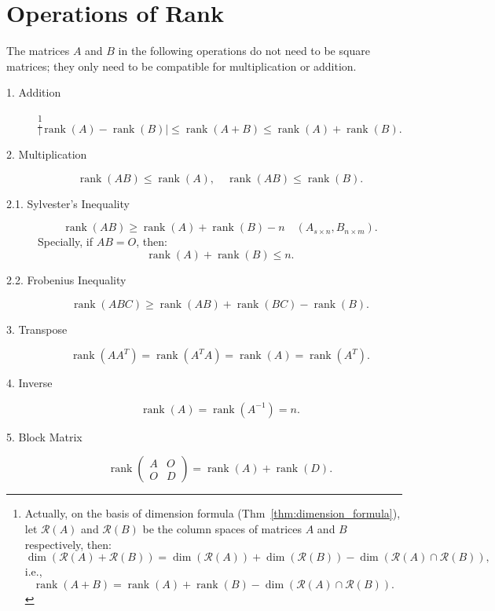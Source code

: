 \documentclass[11pt]{../../TexTemplate/elegantbook} %
\begin{document}
\section{Operations of Rank}
\begin{proposition}
    The matrices \( A \) and \( B \) in the following operations do not need to be square matrices; 
    they only need to be compatible for multiplication or addition.
    \begin{description}
        \item [1. Addition]\footnote{
            Actually, on the basis of dimension formula (Thm~\ref{thm:dimension_formula}),
            let \( \mathcal{R}(A) \) and \( \mathcal{R}(B) \) be the column spaces of matrices \( A \) and \( B \) respectively,
            then:
            \[
            \operatorname{dim}(\mathcal{R}(A) + \mathcal{R}(B)) = 
            \operatorname{dim}(\mathcal{R}(A)) + \operatorname{dim}(\mathcal{R}(B)) - 
            \operatorname{dim}(\mathcal{R}(A) \cap \mathcal{R}(B)),
            \]
            i.e.,
            \[
            \operatorname{rank}(A + B) = \operatorname{rank}(A) + \operatorname{rank}(B) - 
            \operatorname{dim}(\mathcal{R}(A) \cap \mathcal{R}(B)).
            \]
        }
        \[
        \left| \operatorname{rank}(A) - \operatorname{rank}(B) \right| \leqslant 
        \operatorname{rank}(A + B) \leqslant \operatorname{rank}(A) + \operatorname{rank}(B).
        \]
        \item [2. Multiplication]
        \[
        \operatorname{rank}(AB) \leqslant \operatorname{rank}(A), \quad \operatorname{rank}(AB) \leqslant \operatorname{rank}(B).
        \]
        \item[2.1. Sylvester's Inequality]
        \[
        \operatorname{rank}(AB) \geqslant \operatorname{rank}(A) + \operatorname{rank}(B) - n \quad (A_{s \times n}, B_{n \times m}).
        \]
        Specially, if \( AB = O \), then:
        \[
        \operatorname{rank}(A) + \operatorname{rank}(B) \leqslant n.
        \]

        \item[2.2. Frobenius Inequality]
        \[
        \operatorname{rank}(ABC) \geqslant \operatorname{rank}(AB) + \operatorname{rank}(BC) - \operatorname{rank}(B).
        \]

        \item [3. Transpose]
        \[
        \operatorname{rank}(AA^T) = \operatorname{rank}(A^TA) = \operatorname{rank}(A) = \operatorname{rank}(A^T).
        \]

        \item [4. Inverse]
        \[
        \operatorname{rank}(A) = \operatorname{rank}(A^{-1}) = n.
        \]

        \item[5. Block Matrix]
        \[
        \operatorname{rank}\begin{pmatrix} A & O \\ O & D \end{pmatrix} = \operatorname{rank}(A) + \operatorname{rank}(D).
        \]
    \end{description}
\end{proposition}
\end{document}

